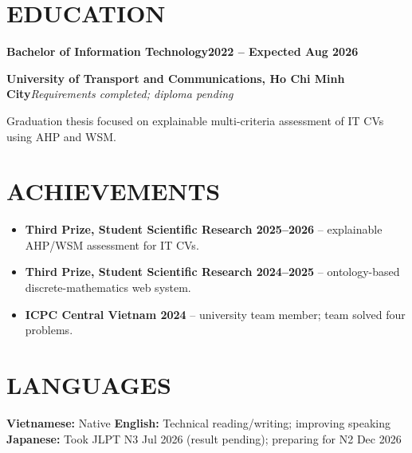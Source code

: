 \documentclass[10pt,a4paper]{article}
\newcommand{\roleline}[2]{%
  \textbf{\large\color{navy}#1}\hfill\textbf{\color{muted}#2}\par
}
\newcommand{\orgline}[2]{%
  \textbf{#1}\hfill\textit{\color{muted}#2}\par
}
\newenvironment{cvitems}{%
  \begin{itemize}[
    leftmargin=14pt,
    label=\textcolor{teal}{\raisebox{0.1ex}{\small\textbullet}},
    itemsep=1.1pt,
    topsep=1pt,
    parsep=0pt,
    partopsep=0pt
  ]
}{\end{itemize}}
\begin{document}
\section{EDUCATION}
\roleline{Bachelor of Information Technology}{2022 -- Expected Aug 2026}
\orgline{University of Transport and Communications, Ho Chi Minh City}{Requirements completed; diploma pending}
Graduation thesis focused on explainable multi-criteria assessment of IT CVs using AHP and WSM.

\section{ACHIEVEMENTS}
\begin{cvitems}
  \item \textbf{Third Prize, Student Scientific Research 2025--2026} -- explainable AHP/WSM assessment for IT CVs.
  \item \textbf{Third Prize, Student Scientific Research 2024--2025} -- ontology-based discrete-mathematics web system.
  \item \textbf{ICPC Central Vietnam 2024} -- university team member; team solved four problems.
\end{cvitems}

\section{LANGUAGES}
\textbf{Vietnamese:} Native \textbar{} \textbf{English:} Technical reading/writing; improving speaking \textbar{} \textbf{Japanese:} Took JLPT N3 Jul 2026 (result pending); preparing for N2 Dec 2026
\end{document}
